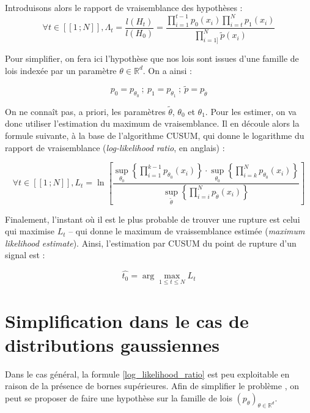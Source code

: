 \documentclass[french,11pt,notitlepage]{report}
\begin{document}
	Introduisons alors le rapport de vraisemblance des hypothèses :
	\begin{equation}
		\forall t \in [\![1\,; N]\!], \Lambda_t = \frac{l(H_t)}{l(H_0)} = \frac{\prod_{i = 1}^{t-1} p_0(x_i) \prod_{i = t}^{N} p_1(x_i)}{\prod_{i = 1]}^{N} \tilde p(x_i)}
	\end{equation}
	
	Pour simplifier, on fera ici l'hypothèse que nos lois sont issues d'une famille de lois indexée par un paramètre $\theta \in \mathbb{R}^d$.
	On a ainsi :
	
	\begin{equation*}
		p_0 = p_{\theta_0}~;~p_1 = p_{\theta_1}~;~\tilde p = p_{\tilde\theta}
	\end{equation*}
	
	On ne connaît pas, a priori, les paramètres $\tilde\theta$, $\theta_0$ et $\theta_1$.
	Pour les estimer, on va donc utiliser l'estimation du maximum de vraisemblance.
	Il en découle alors la formule suivante, à la base de l'algorithme CUSUM, qui donne le logarithme du rapport de vraisemblance (\textit{log-likelihood ratio}, en anglais) :
	
	\begin{equation}
		\forall t \in [\![1\,; N]\!], L_t=\ln \left[ \frac{\sup_{\theta_0}\left\{ \prod_{i=1}^{k-1} p_{\theta_0}(x_i) \right\} \cdot \sup_{\theta_0} \left\{ \prod_{i = k}^{N}p_{\theta_0}(x_i) \right\}}{\sup_{\tilde\theta}\left\{\prod_{i=i}^{N}p_{\tilde{\theta}}(x_i)\right\}} \right]
		\label{log_likelihood_ratio}
	\end{equation}
	
	Finalement, l'instant où il est le plus probable de trouver une rupture est celui qui maximise $L_t$ -- qui donne le maximum de vraissemblance estimée (\emph{maximum likelihood estimate}).
	Ainsi, l'estimation par CUSUM du point de rupture d'un signal est :
	
	\begin{equation}
		\hat{t_0}=\arg\max_{1\le t\le N}L_t
	\end{equation}
	
	
	\section{Simplification dans le cas de distributions gaussiennes}

	
	Dans le cas général, la formule \ref{log_likelihood_ratio} est peu exploitable en raison de la présence de bornes supérieures.
	Afin de simplifier le problème %
	, on peut se proposer de faire une hypothèse sur la famille de lois $(p_\theta)_{\theta \in \mathbb{R}^d}$.
	\\
	
\end{document}
